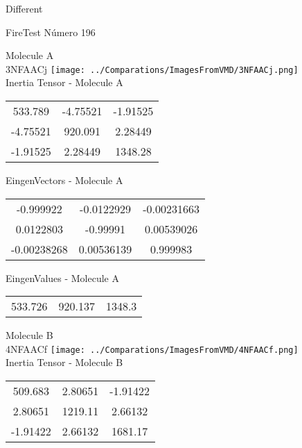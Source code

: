 \begin{center}
\vtab
\vtab
\textcolor{NavyBlue}{\Large Different}
\end{center}

 \newpage

\vtab[-2cm]
\begin{center}
{\large FireTest \tab Número 196}
\end{center}
\begin{multicols}{2}
\begin{center}

Molecule A \\ 
3NFAACj
\texttt{[image: ../Comparations/ImagesFromVMD/3NFAACj.png]}
\\
Inertia Tensor - Molecule A \\
\vtab

\begin{tabular}{|c c c|}
533.789	 & 	-4.75521	 & 	-1.91525	 \\
-4.75521	 & 	920.091	 & 	2.28449	 \\
-1.91525	 & 	2.28449	 & 	1348.28
\end{tabular}

\vtab
 EingenVectors - Molecule A     \\
\vtab
\begin{tabular}{|c c c|}
-0.999922	 & 	-0.0122929	 & 	-0.00231663	 \\
0.0122803	 & 	-0.99991	 & 	0.00539026	 \\
-0.00238268	 & 	0.00536139	 & 	0.999983
\end{tabular}

\vtab
 EingenValues - Molecule A     \\
\vtab
\begin{tabular}{|c c c|}
533.726	 & 	920.137	 & 	1348.3	 \\
\end{tabular}
\columnbreak

Molecule B \\ 
4NFAACf
\texttt{[image: ../Comparations/ImagesFromVMD/4NFAACf.png]}
\\
Inertia Tensor - Molecule B \\
\vtab

\begin{tabular}{|c c c|}
509.683	 & 	2.80651	 & 	-1.91422	 \\
2.80651	 & 	1219.11	 & 	2.66132	 \\
-1.91422	 & 	2.66132	 & 	1681.17
\end{tabular}


\end{center}
\end{multicols}
